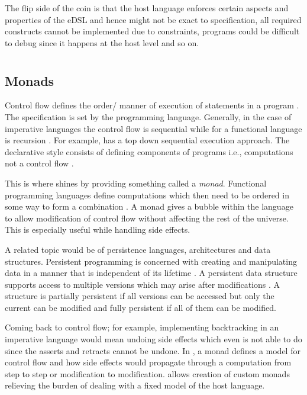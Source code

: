 \documentclass[thesis-solanki.tex]{subfiles}
\begin{document}
  The flip side of the coin is that the host language enforces certain aspects and properties of the eDSL and hence
  might not be exact to specification, all required constructs cannot be implemented due to constraints, programs
  could be difficult to debug since it happens at the host level and so on.


\section{}


\subsection{Monads}
Control flow defines the order/ manner of execution of statements in a pro\-gram \cite{website:controlflowwiki}.
The specification is set by the programming language.
Generally, in the case of imperative languages the control flow is sequential while for a functional language is
recursion \cite{website:controlflowdalhousie}.
For example,  has a top down sequential execution approach.
The declarative style consists of defining components of programs i.e.,
computations not a control flow \cite{website:declarativeprogrammingwiki}.

This is where  shines by providing something called a \textit{monad}.
Functional programming languages
define computations which then need to be ordered in some way to form a
combination \cite{website:monadascomputation}.
A monad gives a bubble within the language to allow modification of control flow without affecting the rest of the
universe.
This is especially useful while handling side effects.

A related topic would be of persistence languages, architectures and data structures.
Persistent programming is concerned with creating and manipulating data in a manner that is independent of its
lifetime \cite{morrison1990persistent}.
A persistent data structure supports access to multiple versions which may arise after modifications
\cite{driscoll1986making, website:persistentdatastructuresmit}.
A structure is partially persistent if all versions can be accessed but only the current can be modified and fully
persistent if all of them can be modified.

Coming back to control flow; for example, implementing backtracking in an imperative language would mean undoing
side effects which even  is not able to do since the asserts and retracts cannot be undone.
In , a monad defines a model for control flow and how side effects would propagate through a
computation from step to step or modification to modification.
 allows creation of custom monads relieving the burden of dealing with a fixed model of the
host language.
\end{document}
